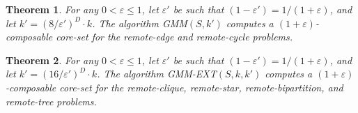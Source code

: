 \documentclass{article}
\newtheorem{theorem}{Theorem}
\renewcommand{\epsilon}{\varepsilon}
\begin{document}
\begin{theorem}\label{thm:mr-edge-cycle}
  For any $0 < \epsilon \leq 1$, let $\epsilon'$ be such that
  $(1-\epsilon')=1/(1+\epsilon)$, and let $k'=(8/\epsilon')^D\cdot
  k$. The algorithm {\sc GMM}$(S, k')$ computes a $(1+\epsilon)$-composable
  core-set for the remote-edge and remote-cycle problems.
\end{theorem}

\begin{theorem}\label{thm:mr-csbt}
  For any $0 < \epsilon \leq 1$, let $\epsilon'$ be such that
  $(1-\epsilon')=1/(1+\epsilon)$, and let
  $k'=(16/\epsilon')^D\cdot k$. The algorithm {\sc
    GMM-EXT}$(S, k, k')$ computes a $(1+\epsilon)$-composable core-set
  for the remote-clique, remote-star, remote-bipartition, and
  remote-tree problems.
\end{theorem}
\end{document}
